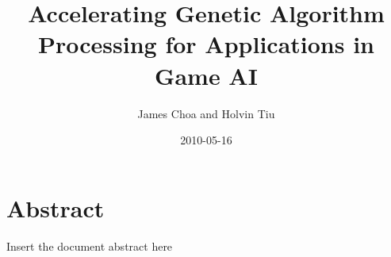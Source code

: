 \documentclass[letterpaper,10pt,titlepage]{article}
\author{James Choa and Holvin Tiu}
\title{Accelerating Genetic Algorithm Processing for Applications in Game AI}
\date{2010-05-16}
\begin{document}
\maketitle

\section*{Abstract}
Insert the document abstract here
\end{document}

